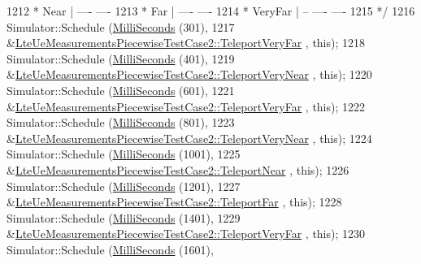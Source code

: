 \begin{DoxyCode}
1212 \textcolor{comment}{   *     Near |                    ----            ----}
1213 \textcolor{comment}{   *      Far |                        ----    ----}
1214 \textcolor{comment}{   *  VeryFar |      --    ----            ----}
1215 \textcolor{comment}{   */}
1216   Simulator::Schedule (\hyperlink{group__timecivil_gaf26127cf4571146b83a92ee18679c7a9}{MilliSeconds} (301),
1217                        &\hyperlink{classLteUeMeasurementsPiecewiseTestCase2_ab62f5e0226e38678f6e2b542f6b1eb5e}{LteUeMeasurementsPiecewiseTestCase2::TeleportVeryFar}
      , \textcolor{keyword}{this});
1218   Simulator::Schedule (\hyperlink{group__timecivil_gaf26127cf4571146b83a92ee18679c7a9}{MilliSeconds} (401),
1219                        &\hyperlink{classLteUeMeasurementsPiecewiseTestCase2_a582eec9b9dd60c08957083693fab1af9}{LteUeMeasurementsPiecewiseTestCase2::TeleportVeryNear}
      , \textcolor{keyword}{this});
1220   Simulator::Schedule (\hyperlink{group__timecivil_gaf26127cf4571146b83a92ee18679c7a9}{MilliSeconds} (601),
1221                        &\hyperlink{classLteUeMeasurementsPiecewiseTestCase2_ab62f5e0226e38678f6e2b542f6b1eb5e}{LteUeMeasurementsPiecewiseTestCase2::TeleportVeryFar}
      , \textcolor{keyword}{this});
1222   Simulator::Schedule (\hyperlink{group__timecivil_gaf26127cf4571146b83a92ee18679c7a9}{MilliSeconds} (801),
1223                        &\hyperlink{classLteUeMeasurementsPiecewiseTestCase2_a582eec9b9dd60c08957083693fab1af9}{LteUeMeasurementsPiecewiseTestCase2::TeleportVeryNear}
      , \textcolor{keyword}{this});
1224   Simulator::Schedule (\hyperlink{group__timecivil_gaf26127cf4571146b83a92ee18679c7a9}{MilliSeconds} (1001),
1225                        &\hyperlink{classLteUeMeasurementsPiecewiseTestCase2_aba969894d5ee56960fd6d66518b8a906}{LteUeMeasurementsPiecewiseTestCase2::TeleportNear}
      , \textcolor{keyword}{this});
1226   Simulator::Schedule (\hyperlink{group__timecivil_gaf26127cf4571146b83a92ee18679c7a9}{MilliSeconds} (1201),
1227                        &\hyperlink{classLteUeMeasurementsPiecewiseTestCase2_aa07c9fc98cb14af186fcba52517d9275}{LteUeMeasurementsPiecewiseTestCase2::TeleportFar}
      , \textcolor{keyword}{this});
1228   Simulator::Schedule (\hyperlink{group__timecivil_gaf26127cf4571146b83a92ee18679c7a9}{MilliSeconds} (1401),
1229                        &\hyperlink{classLteUeMeasurementsPiecewiseTestCase2_ab62f5e0226e38678f6e2b542f6b1eb5e}{LteUeMeasurementsPiecewiseTestCase2::TeleportVeryFar}
      , \textcolor{keyword}{this});
1230   Simulator::Schedule (\hyperlink{group__timecivil_gaf26127cf4571146b83a92ee18679c7a9}{MilliSeconds} (1601),

\end{DoxyCode}
